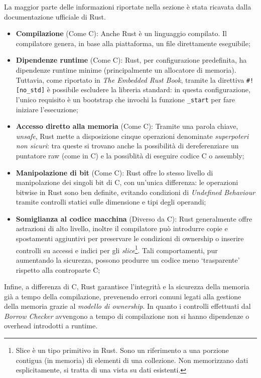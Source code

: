 La maggior parte delle informazioni riportate nella sezione è stata ricavata dalla documentazione ufficiale di Rust\cite{rust-book}.
\begin{itemize}
    \item \textbf{Compilazione} (Come C): Anche Rust è un linguaggio compilato. Il compilatore genera, in base alla piattaforma, un file direttamente eseguibile;
    \item \textbf{Dipendenze runtime} (Come C): Rust, per configurazione predefinita, ha dipendenze runtime minime (principalmente un allocatore di memoria). Tuttavia, come riportato in \textit{The Embedded Rust Book}\cite{rust-book-embedded}, tramite la direttiva \texttt{\#![no\_std]} è possibile escludere la libreria standard: in questa configurazione, l'unico requisito è un bootstrap che invochi la funzione \texttt{\_start} per fare iniziare l'esecuzione;
    \item \textbf{Accesso diretto alla memoria} (Come C): Tramite una parola chiave, \textit{unsafe}, Rust mette a disposizione cinque operazioni denominate \textit{superpoteri non sicuri}: tra queste si trovano anche la possibilità di dereferenziare un puntatore raw (come in C) e la possiblità di eseguire codice C o assembly;
    \item \textbf{Manipolazione di bit} (Come C): Rust offre lo stesso livello di manipolazione dei singoli bit di C, con un'unica differenza: le operazioni bitwise in Rust sono ben definite, evitando condizioni di \textit{Undefined Behaviour} tramite controlli statici sulle dimensione e tipi degli operandi;
    \item \textbf{Somiglianza al codice macchina} (Diverso da C): Rust generalmente offre astrazioni di alto livello, inoltre il compilatore può introdurre copie e spostamenti aggiuntivi per preservare le condizioni di ownership o inserire controlli su accessi e indici per gli \textit{slice}\footnote{Slice è un tipo primitivo in Rust. Sono un riferimento a una porzione contigua (in memoria) di elementi di una collezione. Non memorizzano dati esplicitamente, si tratta di una vista su dati esistenti.}. Tali comportamenti, pur aumentando la sicurezza, possono produrre un codice meno `trasparente' rispetto alla controparte C;\ 
\end{itemize}
Infine, a differenza di C, Rust garantisce l'integrità e la sicurezza della memoria già a tempo della compilazione, prevenendo 
errori comuni legati alla gestione della memoria grazie al \textit{modello di ownership}. In quanto i controlli effettuati
dal \textit{Borrow Checker} avvengono a tempo di compilazione non si hanno dipendenze o overhead introdotti a runtime.

